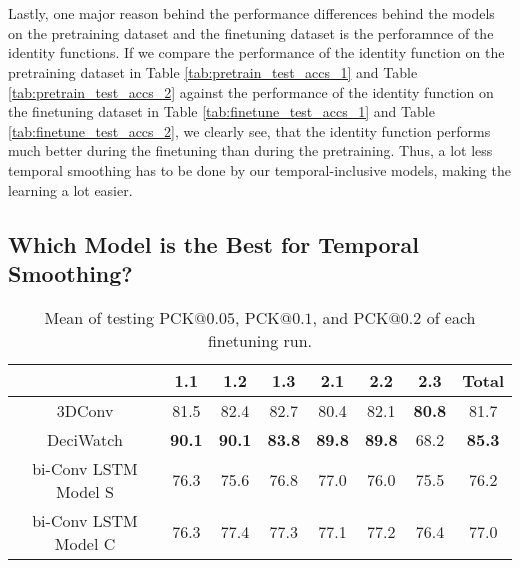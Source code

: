 \documentclass[./main.tex]{subfiles}
\begin{document}
\\
\\
Lastly, one major reason behind the performance differences behind the models on the pretraining dataset and the finetuning dataset is the perforamnce of the identity functions. If we compare the performance of the identity function on the pretraining dataset in Table \ref{tab:pretrain_test_accs_1} and Table \ref{tab:pretrain_test_accs_2} against the performance of the identity function on the finetuning dataset in Table \ref{tab:finetune_test_accs_1} and Table \ref{tab:finetune_test_accs_2}, we clearly see, that the identity function performs much better during the finetuning than during the pretraining. Thus, a lot less temporal smoothing has to be done by our temporal-inclusive models, making the learning a lot easier.

\subsection{Which Model is the Best for Temporal Smoothing?}
\label{sec:best_model}
\begin{table}[htbp]
    \centering
    \begin{tabular}{c||cccccc|c}
        \hline
        & 1.1 & 1.2 & 1.3 & 2.1 & 2.2 & 2.3 & Total \\
        \hline
        \hline
        3DConv & 81.5 & 82.4 & 82.7 & 80.4 & 82.1 & \textbf{80.8} & 81.7 \\
        DeciWatch & \textbf{90.1} & \textbf{90.1} & \textbf{83.8} & \textbf{89.8} & \textbf{89.8} & 68.2 & \textbf{85.3} \\
        bi-Conv LSTM Model S & 76.3 & 75.6 & 76.8 & 77.0 & 76.0 & 75.5 & 76.2 \\
        bi-Conv LSTM Model C & 76.3 & 77.4 & 77.3 & 77.1 & 77.2 & 76.4 & 77.0 \\
        \hline
    \end{tabular}
    \label{tab:finetune_mean_res}
    \caption{Mean of testing PCK$@0.05$, PCK$@0.1$, and PCK$@0.2$ of each finetuning run.}
\end{table}\
\end{document}
